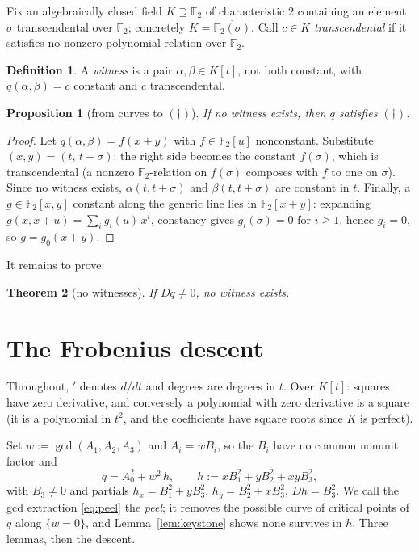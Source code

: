 \documentclass[11pt]{article}
\newtheorem{theorem}{Theorem}
\newtheorem{proposition}[theorem]{Proposition}
\theoremstyle{definition}
\newtheorem{definition}{Definition}
\newcommand{\F}{\mathbb{F}}
\begin{document}
Fix an algebraically closed field $K \supseteq \F_2$ of
characteristic $2$ containing an element $\sigma$ transcendental over
$\F_2$; concretely $K = \overline{\F_2(\sigma)}$.  Call $c \in K$
\emph{transcendental} if it satisfies no nonzero polynomial relation
over $\F_2$.

\begin{definition}\label{def:witness}
A \emph{witness} is a pair $\alpha, \beta \in K[t]$, not both
constant, with $q(\alpha, \beta) = c$ constant and $c$
transcendental.
\end{definition}

\begin{proposition}[from curves to $(\dagger)$]\label{prop:bridge}
If no witness exists, then $q$ satisfies $(\dagger)$.
\end{proposition}

\begin{proof}
Let $q(\alpha,\beta) = f(x+y)$ with $f \in \F_2[u]$ nonconstant.
Substitute $(x,y) = (t,\, t + \sigma)$: the right side becomes the
constant $f(\sigma)$, which is transcendental (a nonzero
$\F_2$-relation on $f(\sigma)$ composes with $f$ to one on $\sigma$).
Since no witness exists, $\alpha(t, t{+}\sigma)$ and
$\beta(t, t{+}\sigma)$ are constant in $t$.  Finally, a
$g \in \F_2[x,y]$ constant along the generic line lies in
$\F_2[x{+}y]$: expanding $g(x, x + u) = \sum_i g_i(u)\, x^i$,
constancy gives $g_i(\sigma) = 0$ for $i \geq 1$, hence $g_i = 0$, so
$g = g_0(x+y)$.
\end{proof}

It remains to prove:

\begin{theorem}[no witnesses]\label{thm:descent}
If $Dq \neq 0$, no witness exists.
\end{theorem}

\section{The Frobenius descent}\label{sec:descent}

Throughout, $'$ denotes $d/dt$ and degrees are degrees in $t$.  Over
$K[t]$: squares have zero derivative, and conversely a polynomial
with zero derivative is a square (it is a polynomial in $t^2$, and
the coefficients have square roots since $K$ is perfect).

Set $w := \gcd(A_1, A_2, A_3)$ and $A_i = w B_i$, so the $B_i$ have
no common nonunit factor and
\begin{equation}\label{eq:peel}
  q = A_0^2 + w^2\, h,
  \qquad
  h := x B_1^2 + y B_2^2 + xy B_3^2 ,
\end{equation}
with $B_3 \neq 0$ and partials
$h_x = B_1^2 + y B_3^2$, $h_y = B_2^2 + x B_3^2$, $Dh = B_3^2$.
We call the gcd extraction \eqref{eq:peel} the \emph{peel}; it
removes the possible curve of critical points of $q$ along
$\{w = 0\}$, and Lemma~\ref{lem:keystone} shows none survives in
$h$.  Three lemmas, then the descent.
\end{document}
